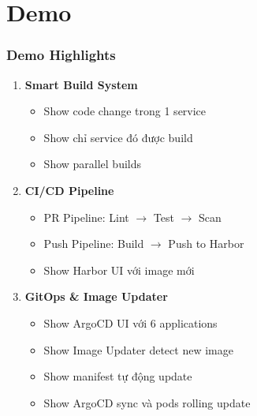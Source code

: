 \documentclass[aspectratio=169]{beamer}
\begin{document}
\section{Demo}

\begin{frame}
\frametitle{Demo Highlights}
\begin{enumerate}
    \item \textbf{Smart Build System}
    \begin{itemize}
        \item Show code change trong 1 service
        \item Show chỉ service đó được build
        \item Show parallel builds
    \end{itemize}
    
    \item \textbf{CI/CD Pipeline}
    \begin{itemize}
        \item PR Pipeline: Lint $\rightarrow$ Test $\rightarrow$ Scan
        \item Push Pipeline: Build $\rightarrow$ Push to Harbor
        \item Show Harbor UI với image mới
    \end{itemize}
    
    \item \textbf{GitOps \& Image Updater}
    \begin{itemize}
        \item Show ArgoCD UI với 6 applications
        \item Show Image Updater detect new image
        \item Show manifest tự động update
        \item Show ArgoCD sync và pods rolling update
    \end{itemize}
\end{enumerate}
\end{frame}
\end{document}
